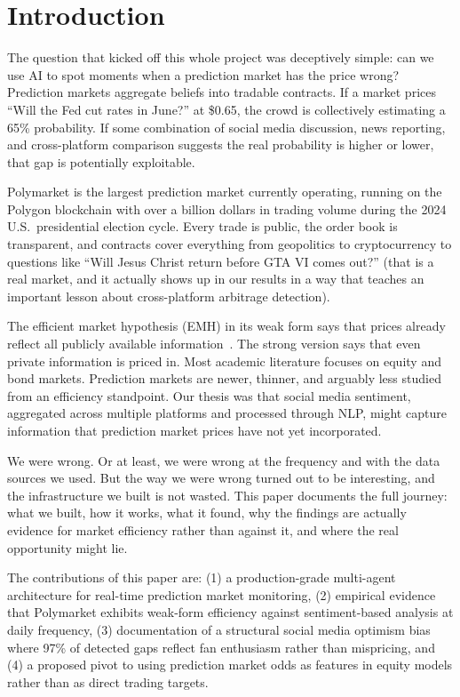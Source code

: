 \documentclass[conference]{IEEEtran}
\begin{document}
\section{Introduction}

The question that kicked off this whole project was deceptively simple: can we use AI to spot moments when a prediction market has the price wrong? Prediction markets aggregate beliefs into tradable contracts. If a market prices ``Will the Fed cut rates in June?'' at \$0.65, the crowd is collectively estimating a 65\% probability. If some combination of social media discussion, news reporting, and cross-platform comparison suggests the real probability is higher or lower, that gap is potentially exploitable.

Polymarket is the largest prediction market currently operating, running on the Polygon blockchain with over a billion dollars in trading volume during the 2024 U.S.\ presidential election cycle. Every trade is public, the order book is transparent, and contracts cover everything from geopolitics to cryptocurrency to questions like ``Will Jesus Christ return before GTA VI comes out?'' (that is a real market, and it actually shows up in our results in a way that teaches an important lesson about cross-platform arbitrage detection).

The efficient market hypothesis (EMH) in its weak form says that prices already reflect all publicly available information~\cite{fama1970}. The strong version says that even private information is priced in. Most academic literature focuses on equity and bond markets. Prediction markets are newer, thinner, and arguably less studied from an efficiency standpoint. Our thesis was that social media sentiment, aggregated across multiple platforms and processed through NLP, might capture information that prediction market prices have not yet incorporated.

We were wrong. Or at least, we were wrong at the frequency and with the data sources we used. But the way we were wrong turned out to be interesting, and the infrastructure we built is not wasted. This paper documents the full journey: what we built, how it works, what it found, why the findings are actually evidence for market efficiency rather than against it, and where the real opportunity might lie.

The contributions of this paper are: (1) a production-grade multi-agent architecture for real-time prediction market monitoring, (2) empirical evidence that Polymarket exhibits weak-form efficiency against sentiment-based analysis at daily frequency, (3) documentation of a structural social media optimism bias where 97\% of detected gaps reflect fan enthusiasm rather than mispricing, and (4) a proposed pivot to using prediction market odds as features in equity models rather than as direct trading targets.
\end{document}
